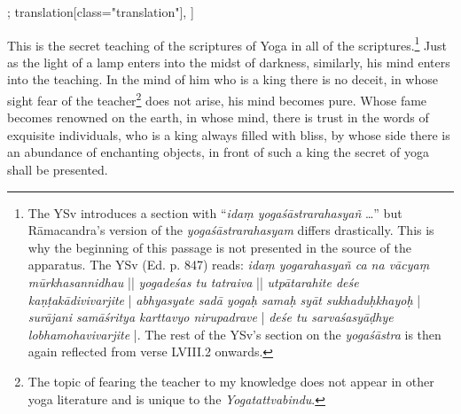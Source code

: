 \begin{alignment}[
  texts=edition[class="edition"];
  translation[class="translation"],
  ]
\begin{translation}
\begin{tlate}[p57_04]
\end{tlate}
\begin{tlate}[p58_01]
\label{secretofscriptures}
This is the secret teaching of the scriptures of Yoga in all of the scriptures.\footnote{The YSv introduces a section with ``\textit{idaṃ yogaśāstrarahasyañ} \ldots'' but Rāmacandra's version of the \textit{yogaśāstrarahasyam} differs drastically. This is why the beginning of this passage is not presented in the source of the apparatus. The YSv (Ed. p. 847) reads: \textit{idaṃ yogarahasyañ ca na vācyaṃ mūrkhasannidhau} || \textit{yogadeśas tu tatraiva} || \textit{utpātarahite deśe kaṇṭakādivivarjite} | \textit{abhyasyate sadā yogaḥ samaḥ syāt sukhaduḥkhayoḥ} | \textit{surājani samāśritya karttavyo nirupadrave} | \textit{deśe tu sarvaśasyāḍhye lobhamohavivarjite} |. The rest of the YSv's section on the \textit{yogaśāstra} is then again reflected from verse LVIII.2 onwards.} Just as the light of a lamp enters into the midst of darkness, similarly, his mind enters into the teaching.
In the mind of him who is a king there is no deceit, in whose sight fear of the teacher\footnote{The topic of fearing the teacher to my knowledge does not appear in other yoga literature and is unique to the \textit{Yogatattvabindu}.} does not arise, his mind becomes pure. 
Whose fame becomes renowned on the earth, in whose mind, there is trust in the words of exquisite individuals, who is a king always filled with bliss, by whose side there is an abundance of enchanting objects, in front of such a king the secret of yoga shall be presented. 
    \end{tlate}
  \end{translation}
\end{alignment}
\pagebreak %
